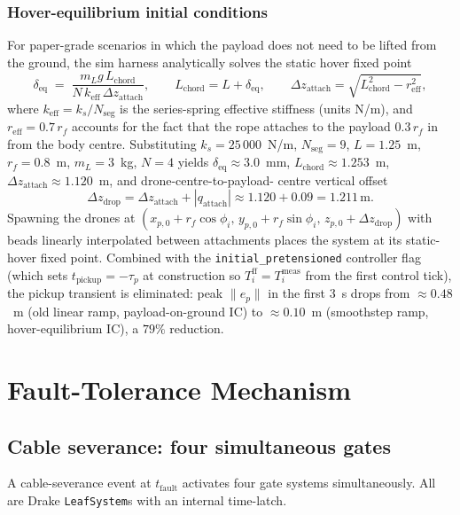 \documentclass[11pt,a4paper,oneside]{report}
\begin{document}
\subsection{Hover-equilibrium initial conditions}
\label{sec:hover-ic}
For paper-grade scenarios in which the payload does not need to be
lifted from the ground, the sim harness analytically solves the static
hover fixed point
\begin{equation}
\delta_\text{eq} \;=\;
\frac{m_L g\,L_\text{chord}}{N\,k_\text{eff}\,\Delta z_\text{attach}},
\qquad
L_\text{chord} = L + \delta_\text{eq},
\qquad
\Delta z_\text{attach} = \sqrt{L_\text{chord}^2 - r_\text{eff}^2},
\label{eq:hover-eq}
\end{equation}
where $k_\text{eff}=k_s/N_\text{seg}$ is the series-spring effective
stiffness (units N/m), and $r_\text{eff} = 0.7\,r_f$ accounts for the
fact that the rope attaches to the payload $0.3\,r_f$ in from the body
centre. Substituting $k_s = 25\,000$~N/m, $N_\text{seg}=9$, $L=1.25$~m,
$r_f = 0.8$~m, $m_L = 3$~kg, $N=4$ yields
$\delta_\text{eq}\approx 3.0$~mm, $L_\text{chord}\approx 1.253$~m,
$\Delta z_\text{attach}\approx 1.120$~m, and drone-centre-to-payload-
centre vertical offset
\begin{equation}
\Delta z_\text{drop} = \Delta z_\text{attach} + |q_\text{attach}|
\approx 1.120 + 0.09 = 1.211\,\text{m}.
\end{equation}
Spawning the drones at
$(x_{p,0} + r_f\cos\phi_i,\, y_{p,0}+r_f\sin\phi_i,\, z_{p,0}+\Delta z_\text{drop})$
with beads linearly interpolated between attachments places the
system at its static-hover fixed point. Combined with the
\texttt{initial\_pretensioned} controller flag (which sets
$t_\text{pickup} = -\tau_p$ at construction so $T_i^\text{ff}=T_i^\text{meas}$
from the first control tick), the pickup transient is eliminated:
peak $\|e_p\|$ in the first 3~s drops from $\approx 0.48$~m (old linear
ramp, payload-on-ground IC) to $\approx 0.10$~m (smoothstep ramp,
hover-equilibrium IC), a $79\%$ reduction.

\chapter{Fault-Tolerance Mechanism}
\label{chap:fault}

\section{Cable severance: four simultaneous gates}

A cable-severance event at $t_{\text{fault}}$ activates four gate
systems simultaneously. All are Drake \texttt{LeafSystem}s with an
internal time-latch.
\end{document}
